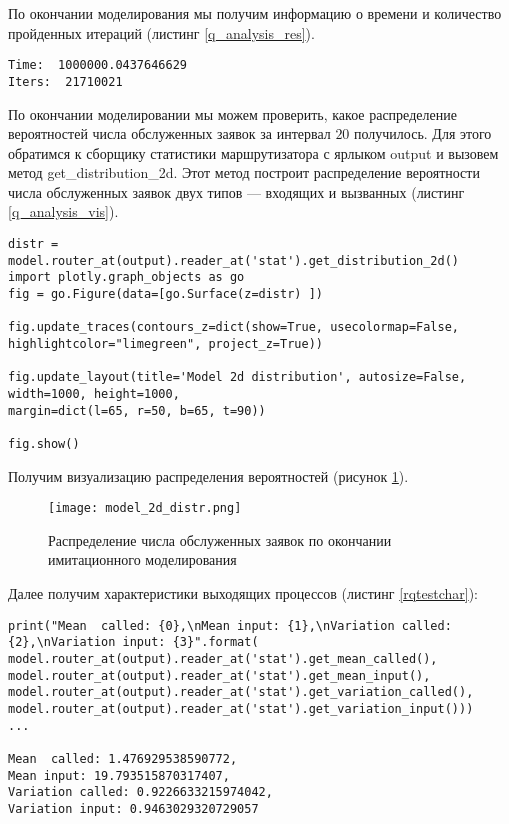 По окончании моделирования мы получим информацию о времени и количество пройденных итераций (листинг \ref{q_analysis_res}).
\begin{lstlisting}
Time:  1000000.0437646629
Iters:  21710021
\end{lstlisting}

По окончании моделировании мы можем проверить, какое распределение вероятностей числа обслуженных заявок за интервал $20$ получилось. Для этого обратимся к сборщику статистики маршрутизатора с ярлыком output и вызовем метод get\_distribution\_2d. Этот метод построит распределение вероятности числа обслуженных заявок двух типов --- входящих и вызванных (листинг \ref{q_analysis_vis}).
\begin{lstlisting}
distr = model.router_at(output).reader_at('stat').get_distribution_2d()
import plotly.graph_objects as go
fig = go.Figure(data=[go.Surface(z=distr) ])

fig.update_traces(contours_z=dict(show=True, usecolormap=False,
highlightcolor="limegreen", project_z=True))

fig.update_layout(title='Model 2d distribution', autosize=False,
width=1000, height=1000,
margin=dict(l=65, r=50, b=65, t=90))

fig.show()
\end{lstlisting}

Получим визуализацию распределения вероятностей (рисунок \ref{model_2d_distr}).
\begin{figure}[H]
	\centering
	\texttt{[image: model\_2d\_distr.png]}
	\caption{Распределение числа обслуженных заявок по окончании имитационного моделирования} 
	\label{model_2d_distr}
\end{figure}

Далее получим характеристики выходящих процессов (листинг \ref{rqtestchar}):
\begin{lstlisting}
print("Mean  called: {0},\nMean input: {1},\nVariation called: {2},\nVariation input: {3}".format(
model.router_at(output).reader_at('stat').get_mean_called(),
model.router_at(output).reader_at('stat').get_mean_input(),
model.router_at(output).reader_at('stat').get_variation_called(),
model.router_at(output).reader_at('stat').get_variation_input()))
...

Mean  called: 1.476929538590772,
Mean input: 19.793515870317407,
Variation called: 0.9226633215974042,
Variation input: 0.9463029320729057
\end{lstlisting}

